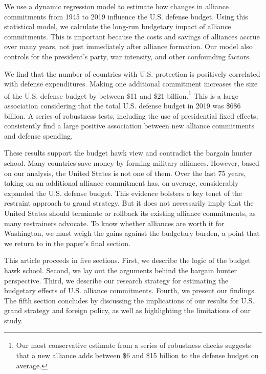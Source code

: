 We use a dynamic regression model to estimate how changes in alliance commitments from 1945 to 2019 influence the U.S. defense budget. Using this statistical model, we calculate the long-run budgetary impact of alliance commitments. This is important because the costs and savings of alliances accrue over many years, not just immediately after alliance formation. Our model also controls for the president's party, war intensity, and other confounding factors. 

We find that the number of countries with U.S. protection is positively correlated with defense expenditures. Making one additional commitment increases the size of the U.S. defense budget by between \$11 and \$21 billion.\footnote{Our most conservative estimate from a series of robustness checks suggests that a new alliance adds between \$6 and \$15 billion to the defense budget on average.} This is a large association considering that the total U.S. defense budget in 2019 was \$686 billion.\autocite{collinsDO20} A series of robustness tests, including the use of presidential fixed effects, consistently find a large positive association between new alliance commitments and defense spending. 

These results support the budget hawk view and contradict the bargain hunter school. Many countries save money by forming military alliances.\autocite[See, for example,][]{DigiuseppePoast2016} However, based on our analysis, the United States is not one of them. Over the last 75 years, taking on an additional alliance commitment has, on average, considerably expanded the U.S. defense budget. This evidence bolsters a key tenet of the restraint approach to grand strategy. But it does not necessarily imply that the United States should terminate or rollback its existing alliance commitments, as many restrainers advocate. To know whether alliances are worth it for Washington, we must weigh the gains against the budgetary burden, a point that we return to in the paper's final section.


This article proceeds in five sections. First, we describe the logic of the budget hawk school. Second, we lay out the arguments behind the bargain hunter perspective. Third, we describe our research strategy for estimating the budgetary effects of U.S. alliance commitments. Fourth, we present our findings. The fifth section concludes by discussing the implications of our results for U.S. grand strategy and foreign policy, as well as highlighting the limitations of our study.


